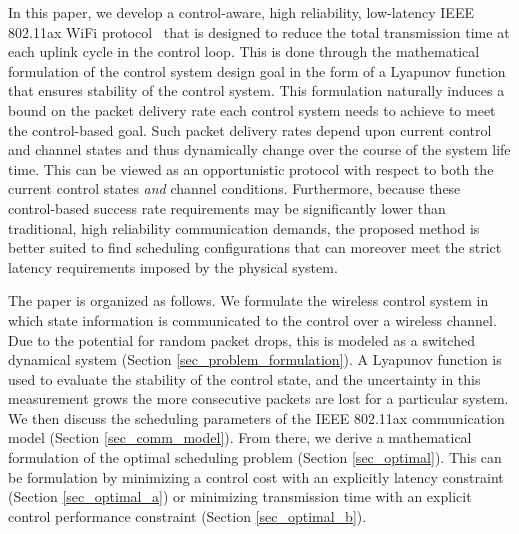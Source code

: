 In this paper, we develop a control-aware, high reliability, low-latency IEEE 802.11ax WiFi protocol~\cite{bellalta2016ieee} that is designed to reduce the total transmission time at each uplink cycle in the control loop. This is done through the mathematical formulation of the control system design goal in the form of a Lyapunov function that ensures stability of the control system. This formulation naturally induces a bound on the packet delivery rate each control system needs to achieve to meet the control-based goal. Such packet delivery rates depend upon current control and channel states and thus dynamically change over the course of the system life time. This can be viewed as an opportunistic protocol with respect to both the current control states \emph{and} channel conditions. Furthermore, because these control-based success rate requirements may be significantly lower than traditional, high reliability communication demands, the proposed method is better suited to find scheduling configurations that can moreover meet the strict latency requirements imposed by the physical system. 

The paper is organized as follows. We formulate the wireless control system in which state information is communicated to the control over a wireless channel. Due to the potential for random packet drops, this is modeled as a switched dynamical system (Section \ref{sec_problem_formulation}). A Lyapunov function is used to evaluate the stability of the control state, and the uncertainty in this measurement grows the more consecutive packets are lost for a particular system.  We then discuss the scheduling parameters of the IEEE 802.11ax communication model (Section \ref{sec_comm_model}).
From there, we derive a mathematical formulation of the optimal scheduling problem (Section \ref{sec_optimal}). This can be formulation by minimizing a control cost with an explicitly latency constraint (Section \ref{sec_optimal_a}) or minimizing transmission time with an explicit control performance constraint (Section \ref{sec_optimal_b}).

